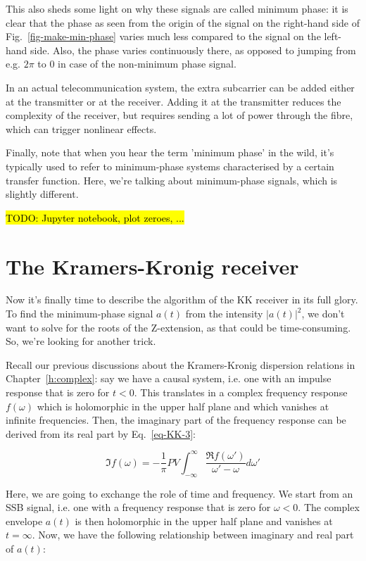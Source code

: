 This also sheds some light on why these signals are called minimum phase: it is clear that the phase as seen from the origin of the signal on the right-hand side of Fig.~\ref{fig-make-min-phase} varies much less compared to the signal on the left-hand side. Also, the phase varies continuously there, as opposed to jumping from e.g. $2 \pi$ to 0 in case of the non-minimum phase signal.

In an actual telecommunication system, the extra subcarrier can be added either at the transmitter or at the receiver. Adding it at the transmitter reduces the complexity of the receiver, but requires sending a lot of power through the fibre, which can trigger nonlinear effects.

Finally, note that when you hear the term 'minimum phase' in the wild, it's typically used to refer to minimum-phase systems characterised by a certain transfer function. Here, we're talking about minimum-phase signals, which is slightly different. 

\hl{TODO: Jupyter notebook, plot zeroes, ...}

\pagebreak

\section{The Kramers-Kronig receiver}

Now it's finally time to describe the algorithm of the KK receiver in its full glory. To find the minimum-phase signal $a(t)$ from the intensity $|a(t)|^2$, we don't want to solve for the roots of the Z-extension, as that could be time-consuming. So, we're looking for another trick.

Recall our previous discussions about the Kramers-Kronig dispersion relations in Chapter~\ref{h:complex}: say we have a causal system, i.e. one with an impulse response that is zero for $t<0$. This translates in a complex frequency response $f(\omega)$ which is holomorphic in the upper half plane and which vanishes at infinite frequencies. Then, the imaginary part of the frequency response can be derived from its real part by Eq.~\ref{eq-KK-3}:

\begin{equation}
\Im f(\omega) = -\frac{1}{\pi} PV \int_{- \infty}^{\infty} \frac{\Re
    f(\omega')}{\omega'-\omega}d\omega'
\end{equation} 

Here, we are going to exchange the role of time and frequency. We start from an SSB signal, i.e. one with a frequency response that is zero for $\omega<0$. The complex envelope $a(t)$ is then holomorphic in the upper half plane and vanishes at $t=\infty$. Now, we have the following relationship between imaginary and real part of $a(t)$:

